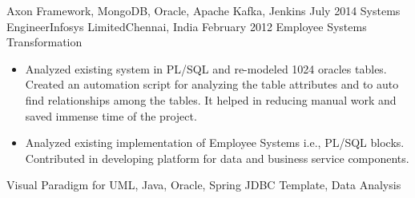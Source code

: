 \begin{experiences}
{\begin{itemize}
                      \end{itemize}
                    }
                    {Axon Framework, MongoDB, Oracle, Apache Kafka, Jenkins}
  \emptySeparator
     \consultantexperience
    {July 2014}   {Systems Engineer}{Infosys Limited}{Chennai, India}
    {February 2012} {}{Employee Systems Transformation}
    {
                      \begin{itemize}
                        \item Analyzed existing system in PL/SQL and re-modeled 1024 oracles tables. Created an automation script for
analyzing the table attributes and to auto find relationships among the tables. It helped in reducing manual work
and saved immense time of the project.
                        \item Analyzed existing implementation of Employee Systems i.e., PL/SQL blocks. Contributed in developing platform
for data and business service components.
                      \end{itemize}
                    }
                    {Visual Paradigm for UML, Java, Oracle, Spring JDBC Template, Data Analysis}
  \emptySeparator
\end{experiences}
